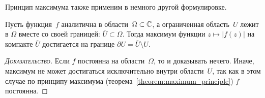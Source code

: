 \documentclass[../complex-analysis.tex]{subfiles}
\begin{document}
  Принцип максимума также применим в немного другой формулировке.

  \begin{crly}
   \label{corollary:maximum_principle_border}
   Пусть функция~$ f $ аналитична в области~$ \Omega \subset \mathbb{C} $, а ограниченная область~$ U $ лежит в $ \Omega $ вместе со своей границей: $ \overline U \subset \Omega $. Тогда максимум функции $ z \mapsto \left| f(z) \right| $ на компакте $ \overline U $ достигается на границе $ \partial U = \overline U \setminus U $.
  \end{crly}
  \begin{proof}[\normalfont\textsc{Доказательство}]
   Если $ f $  постоянна на области~$ \Omega $, то и доказывать нечего. Иначе, максимум не может достигаться исключительно внутри области~$ U $, так как в этом случае по принципу максимума (теорема~\ref{theorem:maximum_principle}) $ f $ постоянна.
  \end{proof}

  
\end{document}
